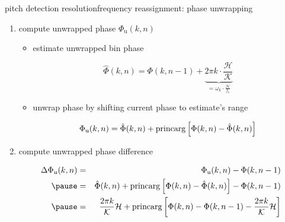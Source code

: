         \begin{frame}{pitch detection resolution}{frequency reassignment: phase unwrapping}

            \begin{enumerate}
                \item	compute unwrapped phase $\Phi_{\mathrm{u}}(k,n)$ 
                        \begin{itemize}
                            \item	estimate unwrapped bin phase
                                    \begin{footnotesize}
                                    \begin{equation*}\label{eq:phi_est}
                                        \hat{\Phi}(k,n) = \Phi(k,n-1) + \underbrace{2\pi k\cdot\frac{\mathcal{H}}{\mathcal{K}}}_{=\omega_k\cdot\frac{\mathcal{H}}{f_\mathrm{s}}} 
                                    \end{equation*}
                                    \end{footnotesize}

                            \item<2->	unwrap phase by shifting current phase to estimate's range
                                    \begin{footnotesize}
                                    \begin{equation*}
                                        \Phi_{\mathrm{u}}(k,n) = \hat{\Phi}(k,n) + \operatorname*{princarg}\left[ \Phi(k,n) - \hat{\Phi}(k,n) \right]
                                    \end{equation*}
                                    \end{footnotesize}
                        \end{itemize}

                \item<3->	compute unwrapped phase difference
                        \begin{footnotesize}
                        \begin{eqnarray*}
                            \Delta\Phi_{\mathrm{u}}(k,n)	&=& \Phi_{\mathrm{u}}(k,n) - \Phi(k,n-1)\nonumber\\
                                                \pause
                                                &=& \hat{\Phi}(k,n) + \princarg\left[ \Phi(k,n) - \hat{\Phi}(k,n) \right] - \Phi(k,n-1)\nonumber \\
                                                \pause
                                                &=& \frac{2\pi k}{\mathcal{K}}\mathcal{H} + \princarg\left[ \Phi(k,n) - \Phi(k,n-1) - \frac{2\pi k}{\mathcal{K}}\mathcal{H} \right]\nonumber
                        \end{eqnarray*}
                        \end{footnotesize}
            \end{enumerate}
        
        \end{frame}
